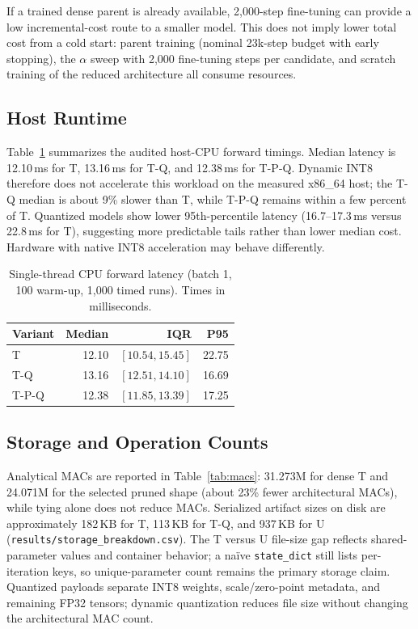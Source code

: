 \documentclass[journal]{IEEEtran}
\begin{document}
If a trained dense parent is already available, 2,000-step
fine-tuning can provide a low incremental-cost route to a smaller
model.
This does not imply lower total cost from a cold start:
parent training (nominal 23k-step budget with early stopping),
the $\alpha$ sweep with 2,000 fine-tuning steps per candidate,
and scratch training of the reduced architecture all consume
resources.

\subsection{Host Runtime}

Table~\ref{tab:latency} summarizes the audited host-CPU forward
timings.
Median latency is 12.10\,ms for T, 13.16\,ms for T-Q, and
12.38\,ms for T-P-Q.
Dynamic INT8 therefore does not accelerate this workload on the
measured x86\_64 host; the T-Q median is about 9\% slower than T,
while T-P-Q remains within a few percent of T.
Quantized models show lower 95th-percentile latency
(16.7--17.3\,ms versus 22.8\,ms for T), suggesting more predictable
tails rather than lower median cost.
Hardware with native INT8 acceleration may behave differently.

\begin{table}[t]
\caption{Single-thread CPU forward latency (batch 1, 100 warm-up,
1,000 timed runs). Times in milliseconds.}
\label{tab:latency}
\centering
\footnotesize
\begin{tabular}{lrrr}
\toprule
Variant & Median & IQR & P95\\
\midrule
T & 12.10 & $[10.54,15.45]$ & 22.75\\
T-Q & 13.16 & $[12.51,14.10]$ & 16.69\\
T-P-Q & 12.38 & $[11.85,13.39]$ & 17.25\\
\bottomrule
\end{tabular}
\end{table}

\subsection{Storage and Operation Counts}

Analytical MACs are reported in Table~\ref{tab:macs}:
31.273M for dense T and 24.071M for the selected pruned shape
(about 23\% fewer architectural MACs), while tying alone does not
reduce MACs.
Serialized artifact sizes on disk are approximately 182\,KB for T,
113\,KB for T-Q, and 937\,KB for U
(\texttt{results/storage\_breakdown.csv}).
The T versus U file-size gap reflects shared-parameter values and
container behavior; a na\"ive \texttt{state\_dict} still lists
per-iteration keys, so unique-parameter count remains the primary
storage claim.
Quantized payloads separate INT8 weights, scale/zero-point
metadata, and remaining FP32 tensors; dynamic quantization reduces
file size without changing the architectural MAC count.
\end{document}
